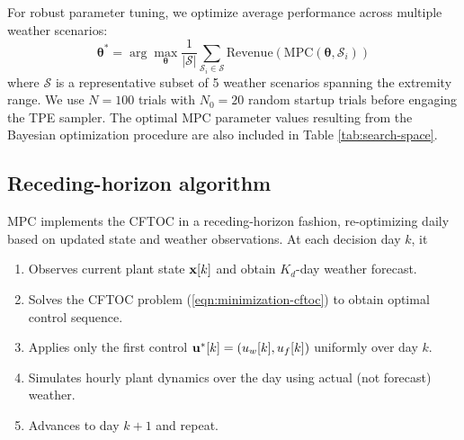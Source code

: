 \documentclass[pdflatex,sn-mathphys-num]{sn-jnl}
\newcommand{\df}[2]{\displaystyle\frac{#1}{#2}}
\begin{document}
For robust parameter tuning, we optimize average performance across multiple weather scenarios:
\begin{equation}
\boldsymbol{\theta}^* = \arg\max_{\boldsymbol{\theta}} \df{1}{|\mathcal{S}|} \sum_{\mathcal{S}_i \in \mathcal{S}} \text{Revenue}(\text{MPC}(\boldsymbol{\theta}, \mathcal{S}_i))
\label{eqn:robust-objective}
\end{equation}
where $\mathcal{S}$ is a representative subset of 5 weather scenarios spanning the extremity range. We use $N = 100$ trials with $N_0 = 20$ random startup trials before engaging the TPE sampler. The optimal MPC parameter values resulting from the Bayesian optimization procedure are also included in Table \ref{tab:search-space}.

\subsection{Receding-horizon algorithm}\label{subsec:mpc-algorithm}

MPC implements the CFTOC in a receding-horizon fashion, re-optimizing daily based on updated state and weather observations. At each decision day $k$, it
\begin{enumerate}
\item Observes current plant state ${\bf x}[k]$ and obtain $K_{d}$-day weather forecast.
\item Solves the CFTOC problem (\ref{eqn:minimization-cftoc}) to obtain optimal control sequence.
\item Applies only the first control ${\bf u}^*[k] = (u_{w}[k], u_{f}[k])$ uniformly over day $k$.
\item Simulates hourly plant dynamics over the day using actual (not forecast) weather.
\item Advances to day $k+1$ and repeat.
\end{enumerate}
\end{document}
